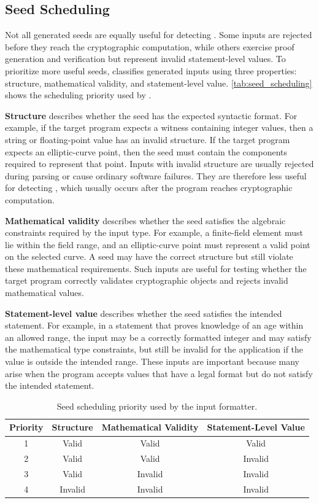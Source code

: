 \subsection{Seed Scheduling}

Not all generated seeds are equally useful for detecting \logicerror. Some inputs are rejected before they reach the cryptographic computation, while others exercise proof generation and verification but represent invalid statement-level values. To prioritize more useful seeds, \greyboxfuzz classifies generated inputs using three properties: structure, mathematical validity, and statement-level value. \autoref{tab:seed_scheduling} shows the scheduling priority used by \greyboxfuzz.

\textbf{Structure} describes whether the seed has the expected syntactic format. For example, if the target program expects a witness containing integer values, then a string or floating-point value has an invalid structure. If the target program expects an elliptic-curve point, then the seed must contain the components required to represent that point. Inputs with invalid structure are usually rejected during parsing or cause ordinary software failures. They are therefore less useful for detecting \logicerror, which usually occurs after the program reaches cryptographic computation.

\textbf{Mathematical validity} describes whether the seed satisfies the algebraic constraints required by the input type. For example, a finite-field element must lie within the field range, and an elliptic-curve point must represent a valid point on the selected curve. A seed may have the correct structure but still violate these mathematical requirements. Such inputs are useful for testing whether the target program correctly validates cryptographic objects and rejects invalid mathematical values.

\textbf{Statement-level value} describes whether the seed satisfies the intended statement. For example, in a statement that proves knowledge of an age within an allowed range, the input may be a correctly formatted integer and may satisfy the mathematical type constraints, but still be invalid for the application if the value is outside the intended range. These inputs are important because many \logicerror arise when the program accepts values that have a legal format but do not satisfy the intended statement.

\begin{table}[t]
\caption{Seed scheduling priority used by the input formatter.}
\label{tab:seed_scheduling}
\vspace*{6pt}
\centering
\begin{tabular}{c|c|c|c}
\hline
Priority & Structure & Mathematical Validity & Statement-Level Value \\ \hline\hline
1 & Valid & Valid & Valid \\ \hline
2 & Valid & Valid & Invalid \\ \hline
3 & Valid & Invalid & Invalid \\ \hline
4 & Invalid & Invalid & Invalid \\ \hline
\end{tabular}
\end{table}

